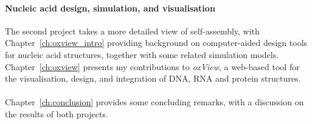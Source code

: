 \paragraph{Nucleic acid design, simulation, and visualisation}
The second project takes a more detailed view of self-assembly, with Chapter~\ref{ch:oxview_intro} providing background on computer-aided design tools for nucleic acid structures, together with some related simulation models. Chapter~\ref{ch:oxview} presents my contributions to \emph{oxView}, a web-based tool for the visualisation, design, and integration of DNA, RNA and protein structures.

\paragraph{}
Chapter~\ref{ch:conclusion} provides some concluding remarks, with a discussion on the results of both projects.



